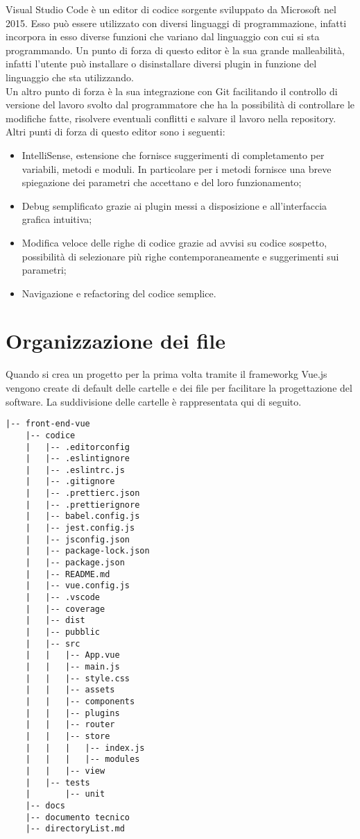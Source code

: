 Visual Studio Code è un editor di codice sorgente sviluppato da Microsoft nel 2015. Esso può essere utilizzato con diversi linguaggi di programmazione, infatti incorpora in esso diverse funzioni che variano dal linguaggio con cui si sta programmando. Un punto di forza di questo editor è la sua grande malleabilità, infatti l'utente può installare o disinstallare diversi plugin in funzione del linguaggio che sta utilizzando.\\
Un altro punto di forza è la sua integrazione con Git facilitando il controllo di versione del lavoro svolto dal programmatore che ha la possibilità di controllare le modifiche fatte, risolvere eventuali conflitti e salvare il lavoro nella repository. Altri punti di forza di questo editor sono i seguenti:
\begin{itemize}
	\item IntelliSense, estensione che fornisce suggerimenti di completamento per variabili, metodi e moduli. In particolare per i metodi fornisce una breve spiegazione dei parametri che accettano e del loro funzionamento;
	\item Debug semplificato grazie ai plugin messi a disposizione e all'interfaccia grafica intuitiva;
	\item Modifica veloce delle righe di codice grazie ad avvisi su codice sospetto, possibilità di selezionare più righe contemporaneamente e suggerimenti sui parametri;
	\item Navigazione e refactoring del codice semplice.
\end{itemize}

\section{Organizzazione dei file}
\label{sec:organizzazione-file}

Quando si crea un progetto per la prima volta tramite il \gls{frameworkg} Vue.js vengono create di default delle cartelle e dei file per facilitare la progettazione del software. La suddivisione delle cartelle è rappresentata qui di seguito.

\begin{lstlisting}[caption=Organizzazione dei file., label=lst::orgFile]
	|-- front-end-vue
	|-- codice
	|   |-- .editorconfig
	|   |-- .eslintignore
	|   |-- .eslintrc.js
	|   |-- .gitignore
	|   |-- .prettierc.json
	|   |-- .prettierignore
	|   |-- babel.config.js
	|   |-- jest.config.js
	|   |-- jsconfig.json
	|   |-- package-lock.json
	|   |-- package.json
	|   |-- README.md
	|   |-- vue.config.js
	|   |-- .vscode
	|   |-- coverage
	|   |-- dist
	|   |-- pubblic
	|   |-- src
	|   |   |-- App.vue
	|   |   |-- main.js
	|   |   |-- style.css
	|   |   |-- assets
	|   |   |-- components
	|   |   |-- plugins
	|   |   |-- router
	|   |   |-- store
	|   |   |   |-- index.js
	|   |   |   |-- modules
	|   |   |-- view
	|   |-- tests
	|       |-- unit
	|-- docs
	|-- documento tecnico
	|-- directoryList.md
\end{lstlisting}

